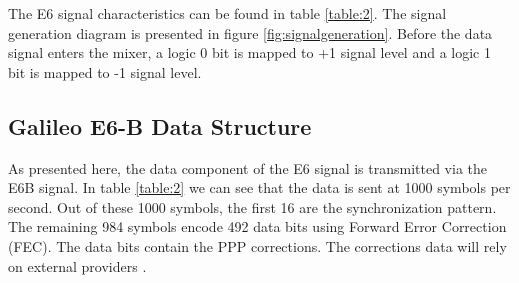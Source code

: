 The E6 signal characteristics can be found in table \ref{table:2}. The signal generation diagram is presented in figure \ref{fig:signalgeneration}. Before the data signal enters the mixer, a logic 0 bit is mapped to +1 signal level and a logic 1 bit is mapped to -1 signal level\cite{e6breceiver}.

\subsection{Galileo E6-B Data Structure}
\label{subsec:e6data}

As presented here, the data component of the E6 signal is transmitted via the E6B signal. In table \ref{table:2} we can see that the data is sent at 1000 symbols per second. Out of these 1000 symbols, the first 16 are the synchronization pattern. The remaining 984 symbols encode 492 data bits using Forward Error Correction (FEC). The data bits contain the PPP corrections. The corrections data will rely on external providers \cite{e6breceiver}. 


